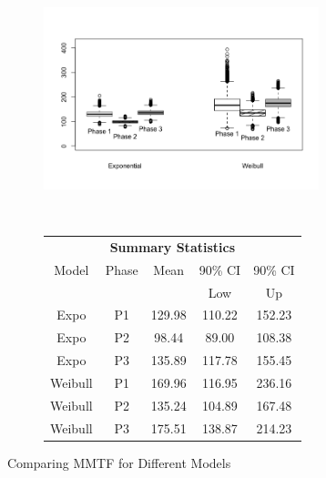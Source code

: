 \documentclass[12pt]{article}
\begin{document}
\begin{figure}[ht]
\centering
\begin{subfigure}{.5\textwidth}
  \centering
      \includegraphics[width=8cm, height=7cm]{Boxplots}
\end{subfigure}%
\begin{subfigure}{.5\textwidth}
  \center
  \begin{tabular}{|c|c|c|c|c|}
  \multicolumn{5}{c}{\textbf{Summary Statistics}} \\
  \cline{1-5}
  Model & Phase & Mean & 90\% CI & 90\% CI \\
   & & & Low & Up \\
  \hline
  Expo & P1   & 129.98   & 110.22 &  152.23 \\
  Expo & P2   & 98.44  & 89.00 &  108.38  \\
  Expo & P3   & 135.89   & 117.78 &  155.45 \\
  Weibull & P1   & 169.96  & 116.95 & 236.16 \\
  Weibull & P2   & 135.24   & 104.89 & 167.48 \\
  Weibull & P3   & 175.51   & 138.87 & 214.23 \\
  \hline
  \end{tabular}
\end{subfigure}
\caption{Comparing MMTF for Different Models}
\label{fig:MMTF Results}
\end{figure}
\end{document}
